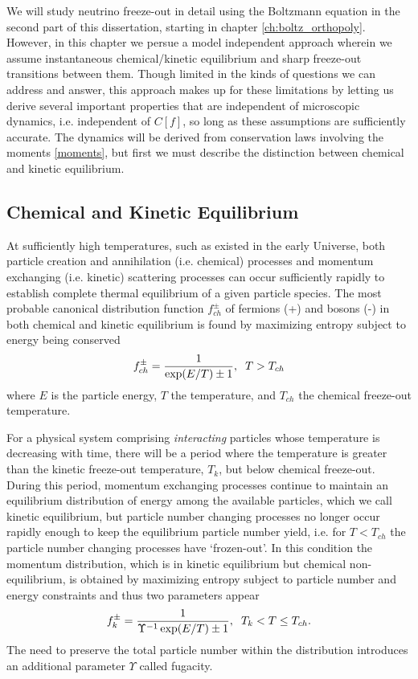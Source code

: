 We will study neutrino freeze-out in detail using the Boltzmann equation in the second part of this dissertation, starting in chapter \ref{ch:boltz_orthopoly}. However, in this chapter we persue a model independent approach wherein we assume instantaneous chemical/kinetic equilibrium and sharp freeze-out transitions between them.  Though limited in the kinds of questions we can address and answer, this approach makes up for these limitations by letting us derive several important properties that are independent of microscopic dynamics, i.e. independent of $C[f]$, so long as these assumptions are sufficiently accurate.  The dynamics will be derived from conservation laws involving the moments \ref{moments}, but first we must describe the distinction between chemical and kinetic equilibrium.


\subsection{Chemical and Kinetic Equilibrium}
At sufficiently high temperatures, such as existed in the early Universe, both particle creation and annihilation (i.e. chemical) processes and momentum exchanging (i.e. kinetic) scattering processes can occur sufficiently rapidly to establish complete thermal equilibrium of a given particle species. The most probable canonical distribution function $f_{ch}^\pm$ of  fermions (+) and bosons (-) in both chemical and kinetic equilibrium is found by maximizing entropy subject to energy being conserved
\begin{equation}\label{ch_eq}
f_{ch}^\pm=\frac{1}{\exp(E/T)\pm 1}, \hspace{2mm} T>T_{ch}
\end{equation}
where $E$ is the particle energy, $T$ the temperature, and $T_{ch}$ the chemical freeze-out temperature. 


For a physical system comprising {\em interacting} particles whose temperature is decreasing with time, there will be a period where the temperature is greater than the kinetic freeze-out temperature, $T_k$, but below chemical freeze-out. During this period, momentum exchanging processes continue to maintain an equilibrium distribution of energy among the available particles, which we call kinetic equilibrium, but particle number changing processes no longer occur rapidly enough to keep the equilibrium particle number yield, i.e. for $T<T_{ch}$ the particle number changing processes have `frozen-out'. In this condition the momentum distribution, which is in kinetic equilibrium but chemical non-equilibrium, is obtained by maximizing  entropy subject to  particle number and energy constraints and thus two parameters appear
\begin{equation}\label{k_eq}
f_{k}^\pm=\frac{1}{\Upsilon^{-1} \exp(E/T)\pm 1},\hspace{2mm} T_k<T\leq T_{ch}.
\end{equation}
The need to preserve the total particle number within the distribution introduces an additional parameter $\Upsilon$ called fugacity. 



